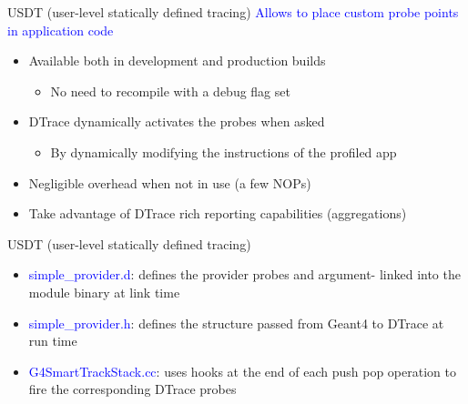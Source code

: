 \documentclass{beamer}
\begin{document}
\begin{frame}{USDT (user-level statically defined tracing)}
\textcolor{blue}{Allows to place custom probe points in application code}
\begin{itemize}
\item Available both in development and production builds
\begin{itemize}
\item No need to recompile with a debug flag set
\end{itemize}
\item DTrace dynamically activates the probes when asked
\begin{itemize}
\item By dynamically modifying the instructions of the profiled app
\end{itemize}
\item Negligible overhead when not in use (a few NOPs)
\item Take advantage of DTrace rich reporting capabilities (aggregations)
\end{itemize}
\end{frame}

\begin{frame}{USDT (user-level statically defined tracing)}
\begin{itemize}
\item \textcolor{blue}{simple\_provider.d}: defines the provider probes and argument-
linked into the module binary at link time
\item \textcolor{blue}{simple\_provider.h}: defines the structure passed from Geant4
to DTrace at run time
\item \textcolor{blue}{G4SmartTrackStack.cc}: uses hooks at the end of each push pop operation
to fire the corresponding DTrace probes
\end{itemize}
\end{frame}
\end{document}
